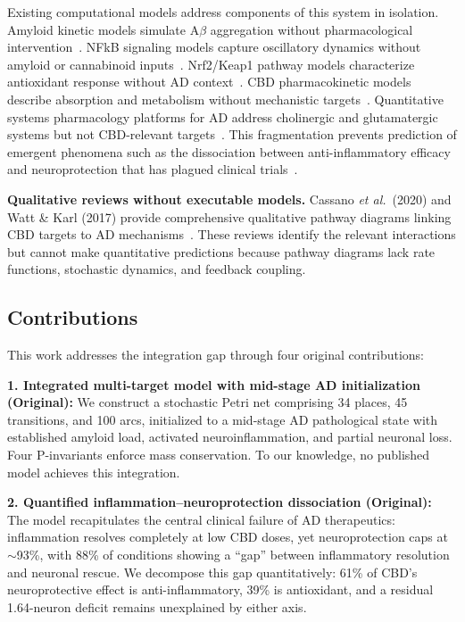 \documentclass[10pt,letterpaper]{article}
\newcommand{\etal}{\textit{et al.}}
\begin{document}
Existing computational models address components of this system in isolation. Amyloid kinetic models simulate A$\beta$ aggregation without pharmacological intervention~\cite{proctor2010,kyrtsos2015}. NFkB signaling models capture oscillatory dynamics without amyloid or cannabinoid inputs~\cite{hoffmann2002}. Nrf2/Keap1 pathway models characterize antioxidant response without AD context~\cite{zhang2017}. CBD pharmacokinetic models describe absorption and metabolism without mechanistic targets~\cite{zgair2016,millar2018}. Quantitative systems pharmacology platforms for AD address cholinergic and glutamatergic systems but not CBD-relevant targets~\cite{geerts2016}. This fragmentation prevents prediction of emergent phenomena such as the dissociation between anti-inflammatory efficacy and neuroprotection that has plagued clinical trials~\cite{heneka2015}.

\vspace{3pt}
\noindent\textbf{Qualitative reviews without executable models.} Cassano \etal\ (2020) and Watt \& Karl (2017) provide comprehensive qualitative pathway diagrams linking CBD targets to AD mechanisms~\cite{cassano2020,watt2017}. These reviews identify the relevant interactions but cannot make quantitative predictions because pathway diagrams lack rate functions, stochastic dynamics, and feedback coupling.

\subsection{Contributions}

This work addresses the integration gap through four original contributions:

\vspace{3pt}
\noindent\textbf{1. Integrated multi-target model with mid-stage AD initialization (Original):} We construct a stochastic Petri net comprising 34 places, 45 transitions, and 100 arcs, initialized to a mid-stage AD pathological state with established amyloid load, activated neuroinflammation, and partial neuronal loss. Four P-invariants enforce mass conservation. To our knowledge, no published model achieves this integration.

\vspace{3pt}
\noindent\textbf{2. Quantified inflammation--neuroprotection dissociation (Original):} The model recapitulates the central clinical failure of AD therapeutics: inflammation resolves completely at low CBD doses, yet neuroprotection caps at $\sim$93\%, with 88\% of conditions showing a ``gap'' between inflammatory resolution and neuronal rescue. We decompose this gap quantitatively: 61\% of CBD's neuroprotective effect is anti-inflammatory, 39\% is antioxidant, and a residual 1.64-neuron deficit remains unexplained by either axis.
\end{document}
